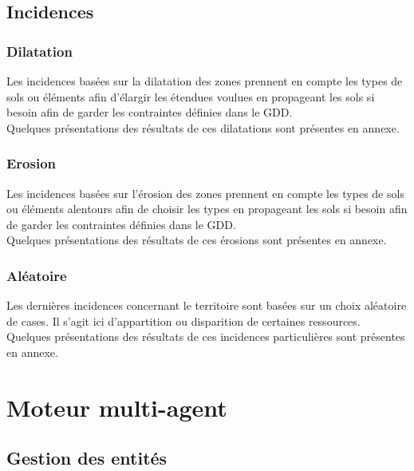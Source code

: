 \documentclass[a4paper]{article}
\newcommand{\alinea}{\hspace*{0.5cm}}
\begin{document}
      \subsection{Incidences}
      \label{IncidenceT}
        \subsubsection{Dilatation}
          \alinea Les incidences basées sur la dilatation des zones prennent en compte les types de sols ou éléments afin d'élargir les étendues voulues en propageant les sols si besoin afin de garder les contraintes définies dans le GDD.\\
          \alinea Quelques présentations des résultats de ces dilatations sont présentes en annexe.\\
        
        \subsubsection{Erosion}
          \alinea Les incidences basées sur l'érosion des zones prennent en compte les types de sols ou éléments alentours afin de choisir les types en propageant les sols si besoin afin de garder les contraintes définies dans le GDD.\\
          \alinea Quelques présentations des résultats de ces érosions sont présentes en annexe.\\
        
        \subsubsection{Aléatoire}
          \alinea Les dernières incidences concernant le territoire sont basées sur un choix aléatoire de cases. Il s'agit ici d'appartition ou disparition de certaines ressources.\\
          \alinea Quelques présentations des résultats de ces incidences particulières sont présentes en annexe.\\

	\section{Moteur multi-agent}
	
		\subsection{Gestion des entités}
		
\end{document}
